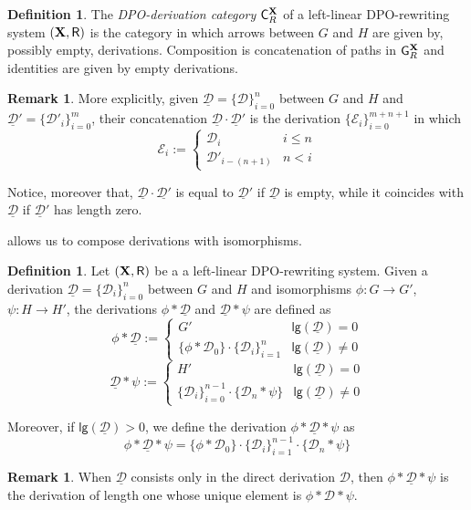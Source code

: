 \documentclass[a4paper]{article}
\newcommand{\dpo}{\textsc{dpo}}
\def\R{\mathsf{R}}
\def\X{\textbf {\textup{X}}}
\newcommand{\dder}[1]{\mathscr{#1}}
\newcommand{\der}[1]{\underline{\dder{#1}}}
\def\dpo{\mathsf{C}^{\X}_R}
\def\gpo{\mathsf{G}^{\X}_R}
\newcommand{\lgh}[0]{\mathsf{lg}}
\theoremstyle{definition}
\newtheorem{definition}[theorem]{Definition}
\newtheorem{remark}[theorem]{Remark}
\begin{document}
\begin{definition}
	The \emph{DPO-derivation category} $\dpo$ of a left-linear DPO-rewriting system $(\X, \R)$ is the category in which arrows between $G$ and $H$ are given by, possibly empty, derivations. Composition is concatenation of paths in $\gpo$ and identities are given by empty derivations.
\end{definition} 	
\begin{remark}
	More explicitly, given $\der{D}=\{\dder{D}\}_{i=0}^n$ between $G$ and $H$ and $\der{D}'=\{\dder{D}'_i\}_{i=0}^m$, their concatenation $\der{D}\cdot\der{D}'$ is the derivation $\{\dder{E}_i\}_{i=0}^{m+n+1}$ in which
	\[\dder{E}_i:=\begin{cases}
		\dder{D}_i & i \leq n\\
		\dder{D}'_{i-(n+1)} & n< i 
	\end{cases}\]	

Notice, moreover that, $\der{D}\cdot \der{D'}$ is equal to $\der{D}'$ if $\der{D}$ is empty, while it coincides with $\der{D}$ if $\der{D}'$ has length zero.
\end{remark}

  allows us to compose derivations with isomorphisms.

\begin{definition} Let $(\X, \R)$ be a a left-linear DPO-rewriting system. Given a derivation $\der{D}=\{\dder{D}_{i}\}_{i=0}^n$ between $G$ and $H$ and isomorphisms $\phi\colon G\to G'$, $\psi\colon H\to H'$, the derivations  $\phi*\der{D}$ and $\der{D}*\psi$ are defined as
	\[\phi *\der{D} := \begin{cases}
		G' & \lgh(\der{D})=0\\ 
		\{\phi* \dder{D}_0\}\cdot \{\dder{D}_i\}_{i=1}^{n}  & \lgh(\der{D})\neq 0
	\end{cases}\] 
	\[\der{D}*\psi := \begin{cases}
		H' & \lgh(\der{D})=0\\ 
		 \{\dder{D}_i\}_{i=0}^{n-1} \cdot \{\dder{D}_n*\psi\} & \lgh(\der{D})\neq 0
	\end{cases}\] 

	Moreover, if $\lgh(\der{D})>0$,  we define the derivation $\phi *\der{D} * \psi$ as
	\[\phi *\der{D} * \psi = \{\phi* \dder{D}_0\}\cdot \{\dder{D}_i\}_{i=1}^{n-1} \cdot \{\dder{D}_n*\psi\}\] 
\end{definition}

\begin{remark}
When $\der{D}$ consists only in the direct derivation $\dder{D}$, then $\phi*\der{D}*\psi$ is the derivation of length one whose unique element is $\phi*\dder{D}*\psi$.
\end{remark}
\end{document}
